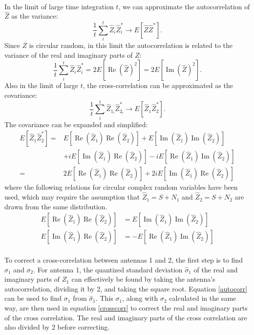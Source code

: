 \documentclass[11pt]{article}
\renewcommand{\Re}{\operatorname{Re}}
\renewcommand{\Im}{\operatorname{Im}}
\begin{document}
\paragraph{}In the limit of large time integration $t$, we can approximate the autocorrelation of $\hat Z$ as the variance:
\begin{equation}
\frac{1}{t}\sum_i^t \hat Z_i \hat Z_i^*\rightarrow E[\hat Z\hat Z^*].
\end{equation}
Since $Z$ is circular random, in this limit the autocorrelation is related to the variance of the real and imaginary parts of $Z$:
\begin{equation}
\frac{1}{t}\sum_i^t \hat Z_i \hat Z_i^*=2E[\Re(\hat Z)^2]=2E[\Im(\hat Z)^2].
\end{equation}
Also in the limit of large $t$, the cross-correlation can be approximated as the covariance:
\begin{equation}
\frac{1}{t}\sum_i^t \hat Z_{1_i} \hat Z_{2_i}^*\rightarrow E[\hat Z_1\hat Z_2^*].
\end{equation}
The covariance can be expanded and simplified:
\begin{align}
E[\hat Z_1\hat Z_2^*]=&E[\Re(\hat Z_1)\Re(\hat Z_2)]+E[\Im(\hat Z_1)\Im(\hat Z_2)]\nonumber\\
&+iE[\Im(\hat Z_1)\Re(\hat Z_2)] -iE[\Re(\hat Z_1)\Im(\hat Z_2)]\nonumber\\
=&2E[\Re(\hat Z_1)\Re(\hat Z_2)]+2iE[\Im(\hat Z_1)\Re(\hat Z_2)] 
\end{align}
where the following relations for circular complex random variables have been used, which may require the assumption that $\hat Z_1=S+N_1$ and $\hat Z_2=S+N_2$ are drawn from the same distribution.
\begin{align}
E[\Re(\hat Z_1)\Re(\hat Z_2)]&=E[\Im(\hat Z_1)\Im(\hat Z_2)]\\
E[\Im(\hat Z_1)\Re(\hat Z_2)]&=-E[\Re(\hat Z_1)\Im(\hat Z_2)]
\end{align}
\paragraph{}To correct a cross-correlation between antennas 1 and 2, the first step is to find $\sigma_1$ and $\sigma_2$. For antenna 1, the quantized standard deviation $\hat \sigma_1$ of the real and imaginary parts of $Z_1$ can effectively be found by taking the antenna's autocorrelation, dividing it by 2, and taking the square root. Equation \ref{autocorr} can be used to find $\sigma_1$ from $\hat \sigma_1$. This $\sigma_1$, along with $\sigma_2$ calculated in the same way, are then used in equation \ref{crosscorr} to correct the real and imaginary parts of the cross correlation. The real and imaginary parts of the cross correlation are also divided by 2 before correcting.
\end{document}
